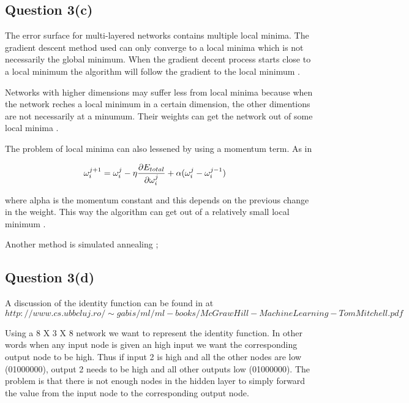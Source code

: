\documentclass[10pt,a4paper]{article}
\begin{document}
\subsection{Question 3(c)}

The error surface for multi-layered networks contains multiple local minima. The gradient descent method used can only converge to a local minima which is not necessarily the global minimum. When the gradient decent process starts close to a local minimum the algorithm will follow the gradient to the local minimum  \citep{Michell2009}.

Networks with higher dimensions may suffer less from local minima because when the network reches a local minimum in a certain dimension, the other dimentions are not necessarily at a minumum. Their weights can get the network out of some local minima  \citep{Michell2009}.
 
The problem of local minima can also lessened by using a momentum term. As in

\begin{equation}
\begin{split}
\omega_i^{j+1} &= \omega_i^j - \eta\pdv{E_{total}}{\omega_i^j} +\alpha (\omega_i^{j}-\omega_i^{j-1})
\end{split}
\end{equation}

where alpha is the momentum constant and this depends on the previous change in the weight. This way the algorithm can get out of a relatively small local minimum \citep{Michell2009}.

Another method is simulated annealing \citep{rojas};
\subsection{Question 3(d)}

A discussion of the identity function can be found in \citep[p106]{Michell2009} at $http://www.cs.ubbcluj.ro/\sim gabis/ml/ml-books/McGrawHill - Machine Learning -Tom Mitchell.pdf$

Using a 8 X 3 X 8 network we want to represent the identity function. In other words when any input node is given an high input we want the corresponding output node to be high. Thus if input 2 is high and all the other nodes are low (01000000), output 2 needs to be high and all other outputs low (01000000).  The problem is that there is not enough nodes in the hidden layer to simply forward the value from the input node to the corresponding output node. 
\end{document}
